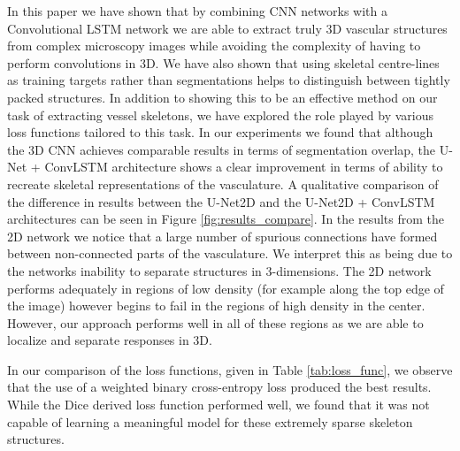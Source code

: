 \documentclass[journal,transmag]{IEEEtran}
\begin{document}
In this paper we have shown that by combining CNN networks with a Convolutional LSTM network we are able to extract truly 3D vascular structures from complex microscopy images while avoiding the complexity of having to perform convolutions in 3D. We have also shown that using skeletal centre-lines as training targets rather than segmentations helps to distinguish between tightly packed structures. In addition to showing this to be an effective method on our task of extracting vessel skeletons, we have explored the role played by various loss functions tailored to this task. In our experiments we found that although the 3D CNN achieves comparable results in terms of segmentation overlap, the U-Net + ConvLSTM architecture shows a clear improvement in terms of ability to recreate skeletal representations of the vasculature. A qualitative comparison of the difference in results between the U-Net2D and the U-Net2D + ConvLSTM architectures can be seen in Figure \ref{fig:results_compare}. In the results from the 2D network we notice that a large number of spurious connections have formed between non-connected parts of the vasculature. We interpret this as being due to the networks inability to separate structures in 3-dimensions. The 2D network performs adequately in regions of low density (for example along the top edge of the image) however begins to fail in the regions of high density in the center. However, our approach performs well in all of these regions as we are able to localize and separate responses in 3D. 

In our comparison of the loss functions, given in Table \ref{tab:loss_func}, we observe that the use of a weighted binary cross-entropy loss produced the best results. While the Dice derived loss function performed well, we found that it was not capable of learning a meaningful model for these extremely sparse skeleton structures. 
\end{document}

